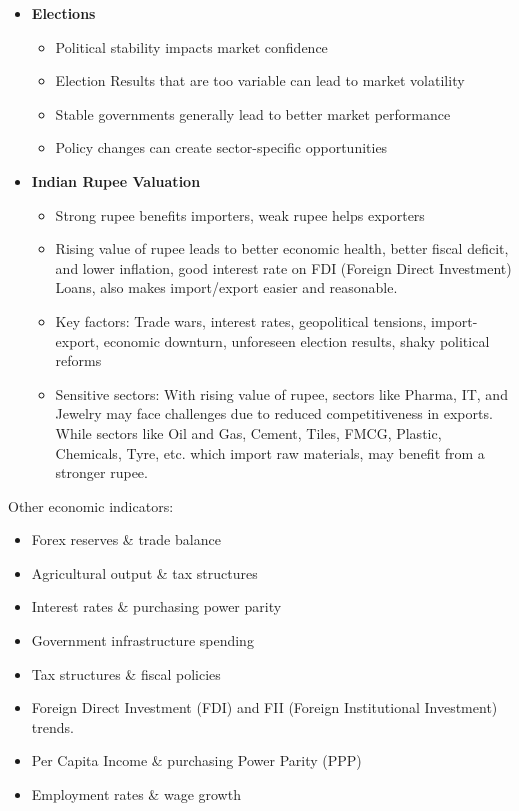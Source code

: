 \documentclass[12pt]{article}
\begin{document}
\begin{itemize}
\item \textbf{Elections}
    \begin{itemize}
    \item Political stability impacts market confidence
    \item Election Results that are too variable can lead to market volatility
    \item Stable governments generally lead to better market performance
    \item Policy changes can create sector-specific opportunities
    \end{itemize}

\item \textbf{Indian Rupee Valuation}
    \begin{itemize}
    \item Strong rupee benefits importers, weak rupee helps exporters
    \item Rising value of rupee leads to better economic health, better fiscal deficit, and lower inflation, good interest rate on FDI (Foreign Direct Investment) Loans, also makes import/export easier and reasonable.
    \item Key factors: Trade wars, interest rates, geopolitical tensions, import-export, economic downturn, unforeseen election results, shaky political reforms
    \item Sensitive sectors: With rising value of rupee, sectors like Pharma, IT, and Jewelry may face challenges due to reduced competitiveness in exports. While sectors like Oil and Gas, Cement, Tiles, FMCG, Plastic, Chemicals, Tyre, etc. which import raw materials, may benefit from a stronger rupee.
    \end{itemize}
\end{itemize}

Other economic indicators:
\begin{itemize}
\item Forex reserves \& trade balance
\item Agricultural output \& tax structures
\item Interest rates \& purchasing power parity
\item Government infrastructure spending
\item Tax structures \& fiscal policies
\item Foreign Direct Investment (FDI) and FII (Foreign Institutional Investment) trends.
\item Per Capita Income \& purchasing Power Parity (PPP)
\item Employment rates \& wage growth
\end{itemize}
\end{document}
